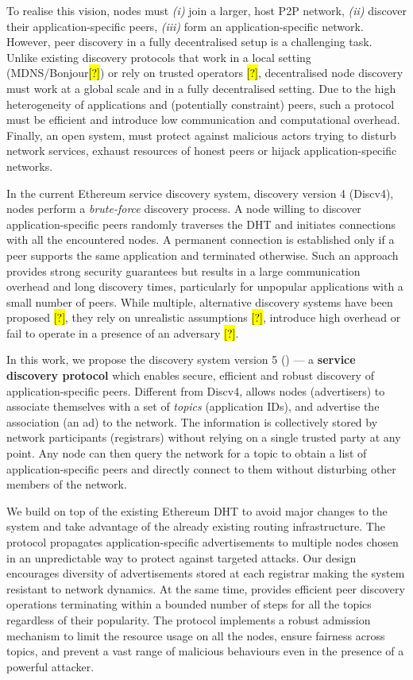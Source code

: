 To realise this vision, nodes must \textit{(i)} join a larger, host P2P network, \textit{(ii)} discover their application-specific peers, \textit{(iii)} form an application-specific network. However, peer discovery in a fully decentralised setup is a challenging task. Unlike existing discovery protocols that work in a local setting (MDNS/Bonjour\hl{[?]}) or rely on trusted operators \hl{[?]}, decentralised node discovery must work at a global scale and in a fully decentralised setting. Due to the high heterogeneity of applications and (potentially constraint) peers, such a protocol must be efficient and introduce low communication and computational overhead. Finally, an open system, must protect against malicious actors trying to disturb network services, exhaust resources of honest peers or hijack application-specific networks. 

 In the current Ethereum service discovery system, \ie discovery version 4 (Discv4), nodes perform a \textit{brute-force} discovery process. A node willing to discover application-specific peers randomly traverses the DHT and initiates connections with all the encountered nodes. A permanent connection is established only if a peer supports the same application and terminated otherwise. Such an approach provides strong security guarantees but results in a large communication overhead and long discovery times, particularly for unpopular applications with a small number of peers. While multiple, alternative discovery systems have been proposed \hl{[?]}, they rely on unrealistic assumptions \hl{[?]}, introduce high overhead or fail to operate in a presence of an adversary \hl{[?]}. 

 In this work, we propose the discovery system version 5 (\textit{\sysname}) --- a \textbf{service discovery protocol} which enables secure, efficient and robust discovery of application-specific peers. Different from Discv4, \sysname allows nodes (\ie advertisers) to associate themselves with a set of \emph{topics} (\eg application IDs), and advertise the association (\ie an ad) to the network. The information is collectively stored by network participants (\ie registrars) without relying on a single trusted party at any point. Any node can then query the network for a topic to obtain a list of application-specific peers and directly connect to them without disturbing other members of the network. 

We build \sysname on top of the existing Ethereum DHT to avoid major changes to the system and take advantage of the already existing routing infrastructure. The protocol propagates application-specific advertisements to multiple nodes chosen in an unpredictable way to protect against targeted attacks. Our design encourages diversity of advertisements stored at each registrar making the system resistant to network dynamics. At the same time, \sysname provides efficient peer discovery operations terminating within a bounded number of steps for all the topics regardless of their popularity. The protocol implements a robust admission mechanism to limit the resource usage on all the nodes, ensure fairness across topics, and prevent a vast range of malicious behaviours even in the presence of a powerful attacker.

